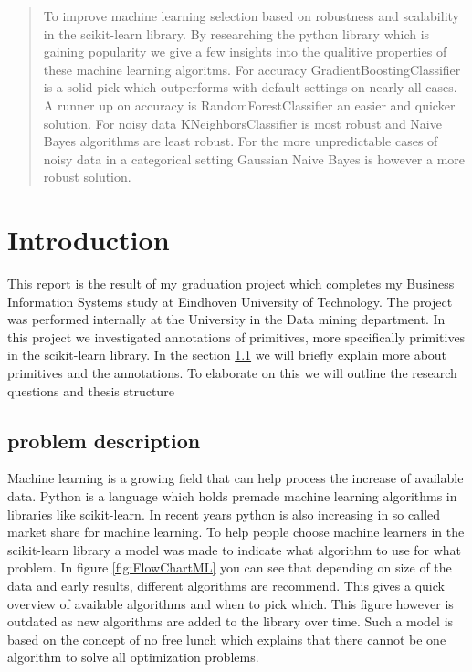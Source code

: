 \documentclass[a4paper,10pt]{article}
\begin{document}
\begin{abstract}
To improve machine learning selection based on robustness and scalability in the scikit-learn library. By researching the python library which is gaining popularity we give a few insights into the qualitive properties of these machine learning algoritms. For accuracy GradientBoostingClassifier is a solid pick which outperforms with default settings on nearly all cases. A runner up on accuracy is RandomForestClassifier an easier and quicker solution. For noisy data KNeighborsClassifier is most robust and Naive Bayes algorithms are least robust. For the more unpredictable cases of noisy data in a categorical setting Gaussian Naive Bayes is however a more robust solution.

\end{abstract}

\newpage
\tableofcontents
\newpage


\section{Introduction} \label{Chapter1}
This report is the result of my graduation project which completes my Business Information Systems study at Eindhoven University of Technology.
The project was performed internally at the University in the Data mining department.
In this project we investigated annotations of primitives, more specifically primitives in the scikit-learn library.
In the section \ref{Intr-Prob} we will briefly explain more about primitives and the annotations.
To elaborate on this we will outline the research questions and thesis structure
 

\subsection{problem description}\label{Intr-Prob}
Machine learning is a growing field that can help process the increase of available data\cite{Big-data}\cite{ML-trends}. 
Python is a language which holds premade machine learning algorithms in libraries like scikit-learn\cite{scikit-learn}.
In recent years python is also increasing in so called market share for machine learning\cite{python-pop}.
To help people choose machine learners in the scikit-learn library a model was made to indicate what algorithm to use for what problem. In figure \ref{fig:FlowChartML} you can see that depending on size of the data and early results, different algorithms are recommend. This gives a quick overview of available algorithms and when to pick which. This figure however is outdated as new algorithms are added to the library over time. Such a model is based on the concept of no free lunch which explains that there cannot be one algorithm to solve all optimization problems\cite{No-Free-Lunch}.  
 
\end{document}
